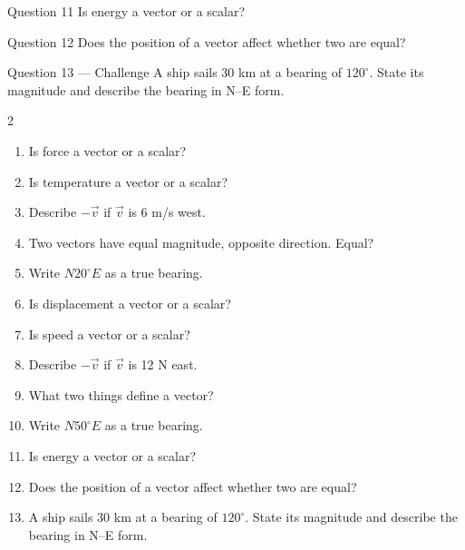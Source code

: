 \documentclass[11pt]{article}
\begin{document}
\begin{qbox}{Question 11}
Is energy a vector or a scalar?\workspace{2.4cm}
\end{qbox}

\begin{qbox}{Question 12}
Does the position of a vector affect whether two are equal?\workspace{2.4cm}
\end{qbox}

\begin{qbox}{Question 13 --- Challenge}
A ship sails 30 km at a bearing of $120^\circ$. State its magnitude and describe the bearing in N–E form.\workspace{2.6cm}
\end{qbox}

\clearpage
{}

\begin{recapbox}
\begin{multicols}{2}
\small
\begin{enumerate}[leftmargin=*,itemsep=3pt]
  \item Is force a vector or a scalar?
  \item Is temperature a vector or a scalar?
  \item Describe $-\vec v$ if $\vec v$ is 6 m/s west.
  \item Two vectors have equal magnitude, opposite direction. Equal?
  \item Write $N20^\circ E$ as a true bearing.
  \item Is displacement a vector or a scalar?
  \item Is speed a vector or a scalar?
  \item Describe $-\vec v$ if $\vec v$ is 12 N east.
  \item What two things define a vector?
  \item Write $N50^\circ E$ as a true bearing.
  \item Is energy a vector or a scalar?
  \item Does the position of a vector affect whether two are equal?
  \item A ship sails 30 km at a bearing of $120^\circ$. State its magnitude and describe the bearing in N–E form.
\end{enumerate}
\end{multicols}
\end{recapbox}
\end{document}
